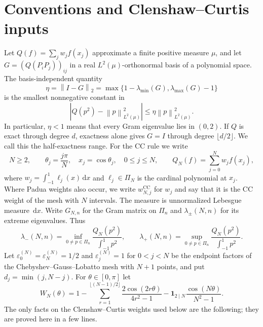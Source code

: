 \documentclass[preprint,12pt,a4paper]{elsarticle}
\theoremstyle{remark}
\newcommand{\CC}{\mathrm{CC}}
\newcommand{\lamin}{\lambda_{\min}}
\newcommand{\lamax}{\lambda_{\max}}
\newcommand{\norm}[1]{\left\lVert#1\right\rVert}
\newcommand{\dd}{\,\mathrm d}
\begin{document}
\section{Conventions and Clenshaw--Curtis inputs}\label{sec:cc-recap}
Let $Q(f)=\sum_j w_j f(x_j)$ approximate a finite positive measure $\mu$,
and let $G=(Q(P_iP_j))_{ij}$ in a real $L^2(\mu)$-orthonormal basis
of a polynomial space. The basis-independent quantity
\begin{equation}\label{eq:eta}
 \eta=\norm{I-G}_2
 =\max\{1-\lamin(G),\lamax(G)-1\}
\end{equation}
is the smallest nonnegative constant in
\[
 |Q(p^2)-\norm p_{L^2(\mu)}^2|\le\eta\norm p_{L^2(\mu)}^2.
\]
In particular, $\eta<1$ means that every Gram eigenvalue lies in $(0,2)$.
If $Q$ is exact through degree $d$, exactness alone gives $G=I$ through
degree $\lfloor d/2\rfloor$. We call this the half-exactness range.
For the CC rule we write
\begin{equation}\label{eq:nodes}
 N\ge2,\qquad \theta_j=\frac{j\pi}{N},\quad x_j=\cos\theta_j,
 \quad 0\le j\le N,
 \qquad Q_N(f)=\sum_{j=0}^N w_j f(x_j),
\end{equation}
where $w_j=\int_{-1}^1\ell_j(x)\dd x$ and $\ell_j\in\Pi_N$ is
the cardinal polynomial at $x_j$. Where Padua weights also occur, we write
$w^{\CC}_{N,j}$ for $w_j$ and say that it is the CC weight of the mesh with $N$
intervals. The measure is unnormalized Lebesgue
measure $\dd x$. Write $G_{N,n}$ for the Gram matrix on $\Pi_n$ and
$\lambda_\pm(N,n)$ for its extreme eigenvalues. Thus
\begin{equation}\label{eq:variational}
 \lambda_-(N,n)=\inf_{0\ne p\in\Pi_n}
 \frac{Q_N(p^2)}{\int_{-1}^1p^2},\qquad
 \lambda_+(N,n)=\sup_{0\ne p\in\Pi_n}
 \frac{Q_N(p^2)}{\int_{-1}^1p^2}.
\end{equation}
Let $\varepsilon^{(N)}_0=\varepsilon^{(N)}_N=1/2$ and
$\varepsilon^{(N)}_j=1$ for $0<j<N$ be the endpoint factors of the
Chebyshev--Gauss--Lobatto mesh with $N+1$ points, and put
$d_j=\min(j,N-j)$. For $\theta\in[0,\pi]$ let
\begin{equation}\label{eq:cc-bracket}
 W_N(\theta)=1-\sum_{r=1}^{\lfloor(N-1)/2\rfloor}
      \frac{2\cos(2r\theta)}{4r^2-1}
 -\boldsymbol1_{2\mid N}\frac{\cos(N\theta)}{N^2-1}.
\end{equation}
The only facts on the Clenshaw--Curtis weights used below are the
following; they are proved here in a few lines.
\end{document}
